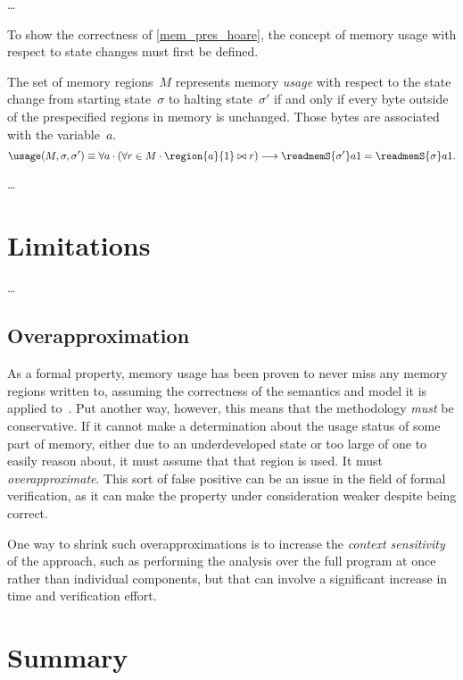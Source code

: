 \todo\dots


To show the correctness of \cref{mem_pres_hoare},
the concept of memory usage with respect to state changes must first be defined.
\begin{definition}
  The set of memory regions~$M$ represents memory \emph{usage} with respect to
  the state change from starting state~$\sigma$ to halting state~$\sigma'$
  if and only if every byte outside of the prespecified regions in memory is unchanged.
  Those bytes are associated with the variable~$a$.
  \begin{equation}
    \usage(M,\sigma,\sigma')\equiv\forall a\cdot(\forall r\in M\cdot\region{a}{1}\bowtie r)
    \longrightarrow\readmemS{\sigma'}a{1}=\readmemS{\sigma}a{1}.
  \end{equation}
\end{definition}
\begin{example}
\end{example}

\todo\dots

\section{Limitations}\label{mem_use_limits}
\todo\dots

\subsection{Overapproximation}\label{mem_use_over}
As a formal property, memory usage has been proven to never miss any memory regions
written to, assuming the correctness of the semantics and model it is applied
to~\citep{bockenek2019preservation,popl2019underreview}.
Put another way, however, this means that the methodology \emph{must} be conservative.
If it cannot make a determination about the usage status of some part of memory,
either due to an underdeveloped state or too large of one to easily reason about,
it must assume that that region is used. It must \emph{overapproximate}.%
This sort of false positive can be an issue in the field of formal verification,
as it can make the property under consideration weaker despite being correct.

One way to shrink such overapproximations is to increase the
\emph{context sensitivity}
of the approach, such as performing the analysis over the full program at once
rather than individual components, but that can involve
a significant increase in time and verification effort.


\section{Summary}
